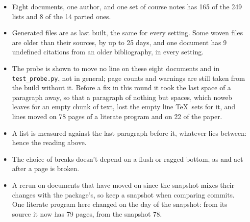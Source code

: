 \begin{itemize}
\item Eight documents, one author, and one set of course notes has 165 of the 249 lists and 8 of the
  14 parted ones.
\item Generated files are as last built, the same for every setting.
  Some woven files are older than their sources, by up to 25 days, and one document has 9 undefined
  citations from an older bibliography, in every setting.
\item The probe is shown to move no line on these eight documents and in \texttt{test\_probe.py},
  not in general; page counts and warnings are still taken from the build without it.
  Before a fix in this round it took the last space of a paragraph away, so that a paragraph of
  nothing but spaces, which \textsf{noweb} leaves for an empty chunk of text, lost the empty line
  \TeX\ sets for it, and lines moved on 78 pages of a literate program and on 22 of the paper.
\item A list is measured against the last paragraph before it, whatever lies between: hence the reading above.
\item The choice of breaks doesn't depend on a flush or ragged bottom, as  and
   act after a page is broken.
\item A rerun on documents that have moved on since the snapshot mixes their changes with the
  package's, so keep a snapshot when comparing commits.
  One literate program here changed on the day of the snapshot: from its source it now has 79 pages,
  from the snapshot 78.
\end{itemize}
